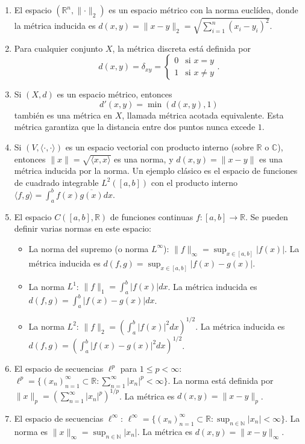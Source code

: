\begin{example}
	\begin{enumerate}
		\item El espacio $(\mathbb{R}^{n}, \lVert \cdot \rVert_2)$ es un espacio métrico con la norma euclídea, donde la métrica inducida es $d(x, y) = \lVert x - y \rVert_2 = \sqrt{\sum_{i=1}^n (x_i - y_i)^2}$.

		\item Para cualquier conjunto $X$, la métrica discreta está definida por $$d(x, y) = \delta_{xy} = \begin{cases} 0 & \text{si } x = y \\ 1 & \text{si } x \neq y \end{cases}.$$

		\item Si $(X, d)$ es un espacio métrico, entonces
		      \begin{equation*}
			      d'(x, y) = \min(d(x, y), 1)
		      \end{equation*}
		      también es una métrica en $X$, llamada métrica acotada equivalente. Esta métrica garantiza que la distancia entre dos puntos nunca excede $1$.

		\item Si $(V, \langle \cdot, \cdot \rangle)$ es un espacio vectorial con producto interno (sobre $\mathbb{R}$ o $\mathbb{C}$), entonces $\|x\| = \sqrt{\langle x, x \rangle}$ es una norma, y $d(x, y) = \|x - y\|$ es una métrica inducida por la norma. Un ejemplo clásico es el espacio de funciones de cuadrado integrable $L^2([a, b])$ con el producto interno $\langle f, g \rangle = \int_a^b f(x)\overline{g(x)} dx$.

		\item El espacio $C([a, b], \mathbb{R})$ de funciones continuas $f: [a, b] \to \mathbb{R}$. Se pueden definir varias normas en este espacio:
		      \begin{itemize}
			      \item La norma del supremo (o norma $L^\infty$): $\|f\|_\infty = \sup_{x \in [a, b]} |f(x)|$. La métrica inducida es $d(f, g) = \sup_{x \in [a, b]} |f(x) - g(x)|$.
			      \item La norma $L^1$: $\|f\|_1 = \int_a^b |f(x)| dx$. La métrica inducida es $d(f, g) = \int_a^b |f(x) - g(x)| dx$.
			      \item La norma $L^2$: $\|f\|_2 = \left( \int_a^b |f(x)|^2 dx \right)^{1/2}$. La métrica inducida es $d(f, g) = \left( \int_a^b |f(x) - g(x)|^2 dx \right)^{1/2}$.
		      \end{itemize}
		\item El espacio de secuencias $\ell^p$ para $1 \le p < \infty$: $\ell^p = \{ (x_n)_{n=1}^\infty \subset \mathbb{R} : \sum_{n=1}^\infty |x_n|^p < \infty \}$. La norma está definida por $\|x\|_p = \left( \sum_{n=1}^\infty |x_n|^p \right)^{1/p}$. La métrica es $d(x, y) = \|x - y\|_p$.
		\item El espacio de secuencias $\ell^\infty$: $\ell^\infty = \{ (x_n)_{n=1}^\infty \subset \mathbb{R} : \sup_{n \in \mathbb{N}} |x_n| < \infty \}$. La norma es $\|x\|_\infty = \sup_{n \in \mathbb{N}} |x_n|$. La métrica es $d(x, y) = \|x - y\|_\infty$.
	\end{enumerate}
\end{example}


